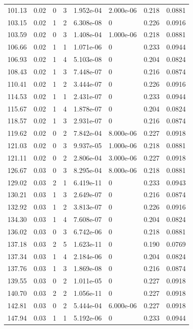 \documentclass[preview]{standalone}
\begin{document}
{{{\begin{tabular}{L{1.2cm}C{1.2cm} C{0.3cm}C{0.5cm} C{1.4cm}C{1.4cm} C{1.4cm}C{1.4cm}}
  101.13  &  0.02  & 0     &  3 &  1.952e-04  & 2.000e-06  & 0.218 &  0.0881   \\ 
  103.15  &  0.02  & 1     &  2 &  6.308e-08  & 0  & 0.226 &  0.0916   \\ 
  103.59  &  0.02  & 0     &  3 &  1.408e-04  & 1.000e-06  & 0.218 &  0.0881   \\ 
  106.66  &  0.02  & 1     &  1 &  1.071e-06  & 0  & 0.233 &  0.0944   \\ 
  106.93  &  0.02  & 1     &  4 &  5.103e-08  & 0  & 0.204 &  0.0824   \\ 
  108.43  &  0.02  & 1     &  3 &  7.448e-07  & 0  & 0.216 &  0.0874   \\ 
  110.41  &  0.02  & 1     &  2 &  3.444e-07  & 0  & 0.226 &  0.0916   \\ 
  114.53  &  0.02  & 1     &  1 &  2.431e-07  & 0  & 0.233 &  0.0944   \\ 
  115.67  &  0.02  & 1     &  4 &  1.878e-07  & 0  & 0.204 &  0.0824   \\ 
  118.57  &  0.02  & 1     &  3 &  2.931e-07  & 0  & 0.216 &  0.0874   \\ 
  119.62  &  0.02  & 0     &  2 &  7.842e-04  & 8.000e-06  & 0.227 &  0.0918   \\ 
  121.03  &  0.02  & 0     &  3 &  9.937e-05  & 1.000e-06  & 0.218 &  0.0881   \\ 
  121.11  &  0.02  & 0     &  2 &  2.806e-04  & 3.000e-06  & 0.227 &  0.0918   \\ 
  126.67  &  0.03  & 0     &  3 &  8.295e-04  & 8.000e-06  & 0.218 &  0.0881   \\ 
  129.02  &  0.03  & 2     &  1 &  6.419e-11  & 0  & 0.233 &  0.0943   \\ 
  130.21  &  0.03  & 1     &  3 &  2.649e-07  & 0  & 0.216 &  0.0874   \\ 
  132.92  &  0.03  & 1     &  2 &  3.813e-07  & 0  & 0.226 &  0.0916   \\ 
  134.30  &  0.03  & 1     &  4 &  7.608e-07  & 0  & 0.204 &  0.0824   \\ 
  136.02  &  0.03  & 0     &  3 &  6.742e-06  & 0  & 0.218 &  0.0881   \\ 
  137.18  &  0.03  & 2     &  5 &  1.623e-11  & 0  & 0.190 &  0.0769   \\ 
  137.34  &  0.03  & 1     &  4 &  2.184e-06  & 0  & 0.204 &  0.0824   \\ 
  137.76  &  0.03  & 1     &  3 &  1.869e-08  & 0  & 0.216 &  0.0874   \\ 
  139.55  &  0.03  & 0     &  2 &  1.011e-05  & 0  & 0.227 &  0.0918   \\ 
  140.70  &  0.03  & 2     &  2 &  1.056e-11  & 0  & 0.227 &  0.0918   \\ 
  142.81  &  0.03  & 0     &  2 &  5.444e-04  & 6.000e-06  & 0.227 &  0.0918   \\ 
  147.94  &  0.03  & 1     &  1 &  5.192e-06  & 0  & 0.233 &  0.0944   \\ 
\hline 
\end{tabular} 

}}}
\end{document}
